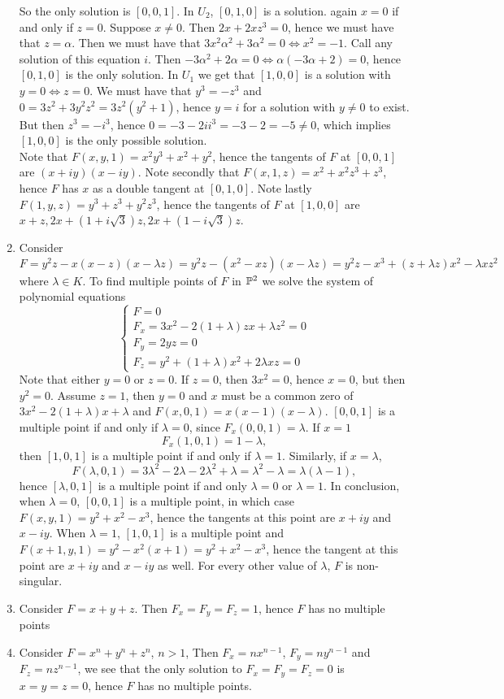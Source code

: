 \begin{example}
\begin{enumerate}
             So the only solution is $[0,0,1]$. In $U_2$, $[0,1,0]$ is a solution. again $x=0$ if and only if $z=0$. Suppose $x\neq 0$. Then $2x+2xz^3=0$, hence we must have that $z = \alpha$. Then we must have that $3x^2\alpha^2+3\alpha^2=0\iff x^2 =-1 $. Call any solution of this equation $i$. Then $-3\alpha^2+2\alpha=0\iff \alpha(-3\alpha+2)=0$, hence $[0,1,0]$ is the only solution. In $U_1$ we get that $[1,0,0]$ is a solution with $y=0\iff z=0$. We must have that $y^3 = -z^3$ and $0=3z^2+3y^2z^2=3z^2(y^2+1)$, hence $y=i$ for a solution with $y\neq0$ to exist. But then $z^3=-i^3$, hence $0=-3-2ii^3=-3-2=-5\neq0$, which implies $[1,0,0]$ is the only possible solution.\\
             Note that $F(x,y,1)= x^2y^3+x^2+y^2$, hence the tangents of $F$ at $[0,0,1]$ are $(x+iy)(x-iy)$. Note secondly that $F(x,1,z)=x^2+x^2z^3+z^3$, hence $F$ has $x$ as a double tangent at $[0,1,0]$. Note lastly $F(1,y,z)=y^3+z^3+y^2z^3$, hence the tangents of $F$ at $[1,0,0]$ are $x+z, 2x+(1+i\sqrt{3})z, 2x+(1-i\sqrt{3})z$.
             \item Consider $F=y^2z-x(x-z)(x-\lambda z)=y^2z-(x^2-xz)(x-\lambda z)= y^2z-x^3+(z+\lambda z)x^2-\lambda xz^2$ where $\lambda\in K$. To find multiple points of $F$ in $\mathbb{P}^2$ we solve the system of polynomial equations
             $$\begin{cases}
                F = 0\\
                F_x = 3x^2-2(1+\lambda)zx+\lambda z^2 = 0\\
                F_y = 2yz = 0\\
                F_z = y^2 + (1+\lambda)x^2+ 2\lambda xz = 0
             \end{cases}$$
              Note that either $y=0$ or $z=0$. If $z=0$, then $3x^2=0$, hence $x=0$, but then $y^2=0$. Assume $z = 1$, then $y = 0$ and $x$ must be a common zero of $3x^2-2(1+\lambda)x+\lambda$ and $F(x,0,1)= x(x-1)(x-\lambda)$. $[0,0,1]$ is a multiple point if and only if $\lambda =0$, since $F_x(0,0,1)= \lambda $. If $x=1$ 
             $$F_x(1,0,1)= 1-\lambda,$$
             then $[1,0,1]$ is a multiple point if and only if $\lambda = 1$. Similarly, if $x=\lambda$,
             $$F(\lambda,0,1)=3\lambda^2-2\lambda-2\lambda^2+\lambda=\lambda^2-\lambda = \lambda(\lambda-1),$$
             hence $[\lambda,0,1]$ is a multiple point if and only $\lambda =0$ or $\lambda =1$. In conclusion, when $\lambda=0$, $[0,0,1]$ is a multiple point, in which case $F(x,y,1)=y^2+x^2-x^3$, hence the tangents at this point are $x+iy$ and $x-iy$. When $\lambda = 1$, $[1,0,1]$ is a multiple point and $F(x+1,y,1)=y^2-x^2(x+1)=y^2+x^2-x^3$, hence the tangent at this point are $x+iy$ and $x-iy$ as well. For every other value of $\lambda$, $F$ is non-singular. 
             \item Consider $F=x+y+z$. Then $F_x=F_y=F_z=1$, hence $F$ has no multiple points
             \item Consider $F= x^n+y^n+z^n$, $n>1$, Then $F_x=nx^{n-1}$, $F_y=ny^{n-1}$ and $F_z=nz^{n-1}$, we see that the only solution to $F_x=F_y=F_z=0$ is $x=y=z=0$, hence $F$ has no multiple points.
        \end{enumerate}
    \end{example}
